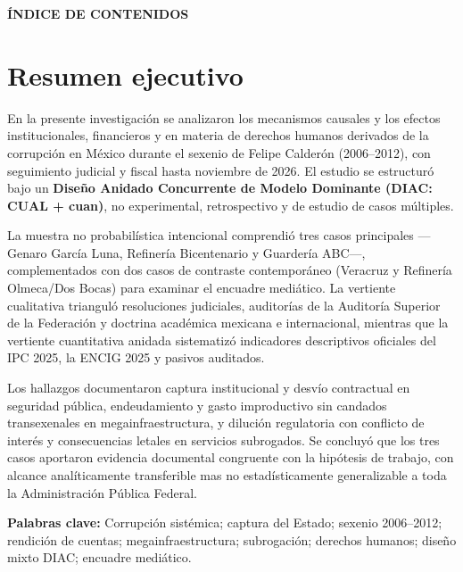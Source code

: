 \documentclass[12pt,letterpaper,oneside,openany]{book}
\begin{document}
\vspace{2cm}

\begin{center}
  {\sffamily\bfseries\color{ateneo-secondary}ÍNDICE DE CONTENIDOS}
\end{center}

\tableofcontents

\clearpage


\chapter*{Resumen ejecutivo}

En la presente investigación se analizaron los mecanismos causales y los efectos institucionales, financieros y en materia de derechos humanos derivados de la corrupción en México durante el sexenio de Felipe Calderón (2006--2012), con seguimiento judicial y fiscal hasta noviembre de 2026. El estudio se estructuró bajo un \textbf{Diseño Anidado Concurrente de Modelo Dominante (DIAC: CUAL + cuan)}, no experimental, retrospectivo y de estudio de casos múltiples.

La muestra no probabilística intencional comprendió tres casos principales ---Genaro García Luna, Refinería Bicentenario y Guardería ABC---, complementados con dos casos de contraste contemporáneo (Veracruz y Refinería Olmeca/Dos Bocas) para examinar el encuadre mediático. La vertiente cualitativa trianguló resoluciones judiciales, auditorías de la Auditoría Superior de la Federación y doctrina académica mexicana e internacional, mientras que la vertiente cuantitativa anidada sistematizó indicadores descriptivos oficiales del IPC 2025, la ENCIG 2025 y pasivos auditados.

Los hallazgos documentaron captura institucional y desvío contractual en seguridad pública, endeudamiento y gasto improductivo sin candados transexenales en megainfraestructura, y dilución regulatoria con conflicto de interés y consecuencias letales en servicios subrogados. Se concluyó que los tres casos aportaron evidencia documental congruente con la hipótesis de trabajo, con alcance analíticamente transferible mas no estadísticamente generalizable a toda la Administración Pública Federal.

\vspace{0.5cm}
{\sffamily\bfseries Palabras clave:} Corrupción sistémica; captura del Estado; sexenio 2006--2012; rendición de cuentas; megainfraestructura; subrogación; derechos humanos; diseño mixto DIAC; encuadre mediático.
\end{document}
